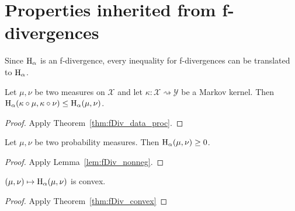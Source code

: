 \section{Properties inherited from f-divergences}

Since $\operatorname{H}_\alpha$ is an f-divergence, every inequality for f-divergences can be translated to $\operatorname{H}_\alpha$.

\begin{theorem}
  \label{thm:hellingerAlpha_data_proc}
  Let $\mu, \nu$ be two measures on $\mathcal X$ and let $\kappa : \mathcal X \rightsquigarrow \mathcal Y$ be a Markov kernel.
  Then $\operatorname{H}_\alpha(\kappa \circ \mu, \kappa \circ \nu) \le \operatorname{H}_\alpha(\mu, \nu)$.
\end{theorem}

\begin{proof}
Apply Theorem~\ref{thm:fDiv_data_proc}.
\end{proof}

\begin{lemma}
  \label{lem:hellingerAlpha_nonneg}
  Let $\mu, \nu$ be two probability measures. Then $\operatorname{H}_\alpha(\mu, \nu) \ge 0$.
\end{lemma}

\begin{proof}
Apply Lemma~\ref{lem:fDiv_nonneg}.
\end{proof}

\begin{lemma}
  \label{lem:hellingerAlpha_convex}
  $(\mu, \nu) \mapsto \operatorname{H}_\alpha(\mu, \nu)$ is convex.
\end{lemma}

\begin{proof}
Apply Theorem~\ref{thm:fDiv_convex}
\end{proof}
